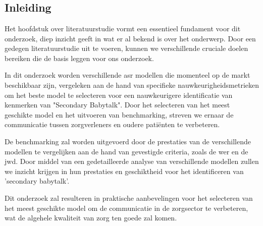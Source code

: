 \chapter{}%
\label{ch:stand-van-zaken}

\section{Inleiding}


Het hoofdstuk over literatuurstudie vormt een essentieel fundament voor dit onderzoek, diep inzicht ge­eft in wat er al beke­nd is over het onderwe­rp. Door een gedegen literatuurstudie uit te voeren, kunnen we verschillende cruciale doelen bereiken die de basis leggen voor ons onderzoek.

In dit onderzoek worden verschillende \gls{asr}  modellen die momenteel op de markt beschikbaar zijn, vergeleken aan de hand van specifieke nauwkeurigheidsmetrieken om het beste model te selecteren voor een nauwkeurigere identificatie van kenmerken van "Secondary Babytalk". Door het selecteren van het meest geschikte model en het uitvoeren van benchmarking, streven we ernaar de communicatie tussen zorgverleners en oudere patiënten te verbeteren. 


De benchmarking zal worden uitgevoerd door de prestaties van de verschillende modellen te vergelijken aan de hand van gevestigde criteria, zoals de \gls{wer} en de \gls{jwd}. 
Door middel van een gedetailleerde analyse van verschillende modellen zullen we inzicht krijgen in hun prestaties en geschiktheid voor het identificeren van 'secondary babytalk'. 


Dit onderzoek zal resulteren in praktische aanbevelingen voor het selecteren van het meest geschikte model om de communicatie in de zorgsector te verbeteren, wat de algehele kwaliteit van zorg ten goede zal komen.


